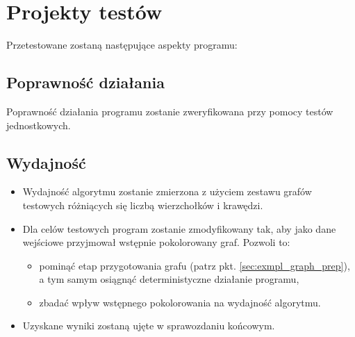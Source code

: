 \section{Projekty testów}
Przetestowane zostaną następujące aspekty programu:

\subsection{Poprawność działania}
Poprawność działania programu zostanie zweryfikowana przy pomocy testów jednostkowych.

\subsection{Wydajność}
\begin{itemize}
 \item Wydajność algorytmu zostanie zmierzona z użyciem zestawu grafów testowych różniących się liczbą wierzchołków i krawędzi.
 \item Dla celów testowych program zostanie zmodyfikowany tak, aby jako dane wejściowe przyjmował wstępnie pokolorowany graf.
  Pozwoli to:
  \begin{itemize}
   \item pominąć etap przygotowania grafu (patrz pkt. \ref{sec:exmpl_graph_prep}), a tym samym osiągnąć deterministyczne działanie programu,
   \item zbadać wpływ wstępnego pokolorowania na wydajność algorytmu.
  \end{itemize}
 \item Uzyskane wyniki zostaną ujęte w sprawozdaniu końcowym.
\end{itemize}
